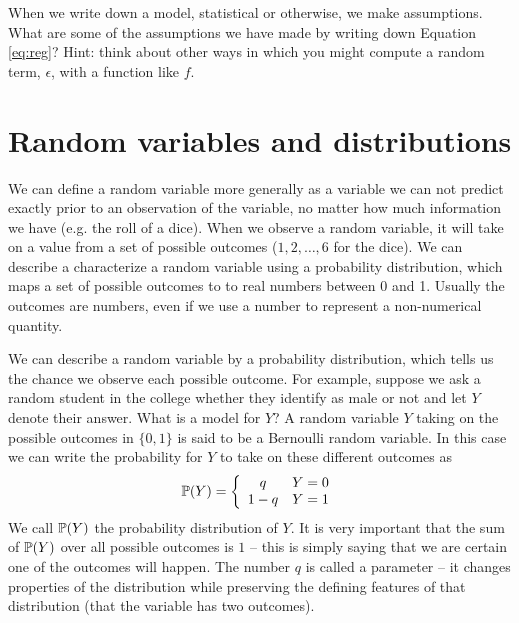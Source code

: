 \begin{exercise}
When we write down a model, statistical or otherwise, we make assumptions. What are some of the assumptions we have made by writing down Equation \eqref{eq:reg}? Hint: think about other ways in which you might compute a random term, $\epsilon$, with a function like $f$.
\end{exercise}


\section{Random variables and distributions}
We can define a random variable more generally as a variable we can not predict exactly prior to an observation of the variable, no matter how much information we have (e.g. the roll of a dice).  When we observe a random variable, it will take on a value from a set of possible outcomes ($1,2,\dots,6$ for the dice). We can describe a characterize a random variable using  a {\dfn probability distribution}, which maps a set of possible outcomes to to real numbers between 0 and 1. Usually the outcomes are numbers, even if we use a number to represent a non-numerical quantity. 


We can describe a random variable by a probability distribution, which tells us the chance we observe each possible outcome.  For example, suppose we ask a random student in the college whether they identify as male or not and let $Y$ denote their answer. What is a model for $Y$? 
 A random variable $Y$ taking on the possible outcomes in $\{0,1\}$ is said to be a Bernoulli random variable. In this case we can write the probability for $Y$ to take on these different outcomes as
\begin{equation}
\mathbb P(Y) = \left\{ \begin{array}{cc}
q & Y=0\\
1-q & Y=1
\end{array}
 \right. 
\end{equation}
We call $\mathbb P(Y)$ the probability distribution of $Y$. It is very important that the sum of $\mathbb P(Y)$ over all possible outcomes is $1$ -- this is simply saying that we are certain one of the outcomes will happen.  The number $q$ is called a {\dfn parameter} -- it changes properties of the distribution while preserving the defining features of that distribution (that the variable has two outcomes). 

